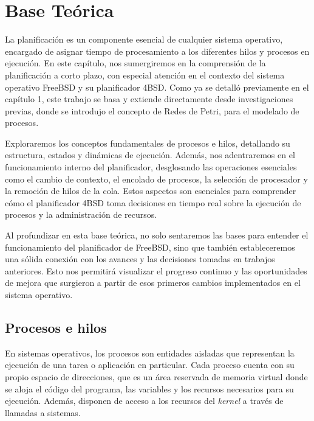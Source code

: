 \section{Base Teórica}

La planificación es un componente esencial de cualquier sistema operativo, encargado de asignar tiempo de procesamiento a los diferentes hilos y procesos en ejecución. En este capítulo, nos sumergiremos en la comprensión de la planificación a corto plazo, con especial atención en el contexto del sistema operativo FreeBSD y su planificador 4BSD. Como ya se detalló previamente en el capítulo 1, este trabajo se basa y extiende directamente desde investigaciones previas\cite{bib1}, donde se introdujo el concepto de Redes de Petri, para el modelado de procesos.\par

Exploraremos los conceptos fundamentales de procesos e hilos, detallando su estructura, estados y dinámicas de ejecución. Además, nos adentraremos en el funcionamiento interno del planificador, desglosando las operaciones esenciales como el cambio de contexto, el encolado de procesos, la selección de procesador y la remoción de hilos de la cola. Estos aspectos son esenciales para comprender cómo el planificador 4BSD toma decisiones en tiempo real sobre la ejecución de procesos y la administración de recursos.\par

Al profundizar en esta base teórica, no solo sentaremos las bases para entender el funcionamiento del planificador de FreeBSD, sino que también estableceremos una sólida conexión con los avances y las decisiones tomadas en trabajos anteriores. Esto nos permitirá visualizar el progreso continuo y las oportunidades de mejora que surgieron a partir de esos primeros cambios implementados en el sistema operativo.\par

\subsection{Procesos e hilos}

En sistemas operativos, los procesos son entidades aisladas que representan la ejecución de una tarea o aplicación en particular. Cada proceso cuenta con su propio espacio de direcciones, que es un área reservada de memoria virtual donde se aloja el código del programa, las variables y los recursos necesarios para su ejecución. Además, disponen de acceso a los recursos del \textit{kernel} a través de llamadas a sistemas.\par

